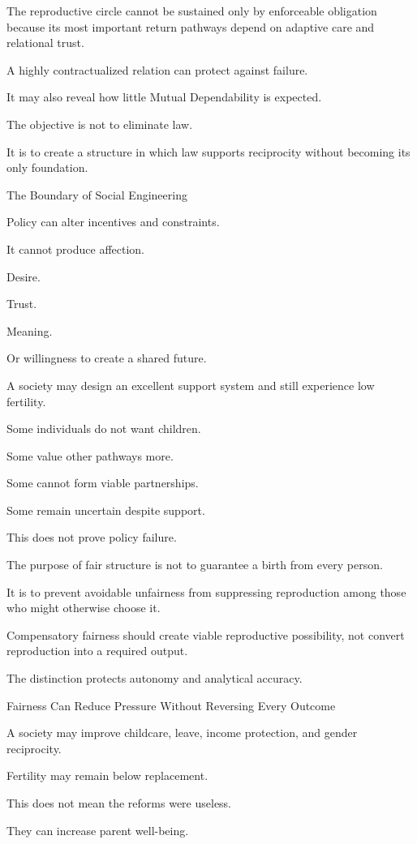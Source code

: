 The reproductive circle cannot be sustained only by enforceable obligation because its most important return pathways depend on adaptive care and relational trust.

A highly contractualized relation can protect against failure.

It may also reveal how little Mutual Dependability is expected.

The objective is not to eliminate law.

It is to create a structure in which law supports reciprocity without becoming its only foundation.

The Boundary of Social Engineering

Policy can alter incentives and constraints.

It cannot produce affection.

Desire.

Trust.

Meaning.

Or willingness to create a shared future.

A society may design an excellent support system and still experience low fertility.

Some individuals do not want children.

Some value other pathways more.

Some cannot form viable partnerships.

Some remain uncertain despite support.

This does not prove policy failure.

The purpose of fair structure is not to guarantee a birth from every person.

It is to prevent avoidable unfairness from suppressing reproduction among those who might otherwise choose it.

Compensatory fairness should create viable reproductive possibility, not convert reproduction into a required output.

The distinction protects autonomy and analytical accuracy.

Fairness Can Reduce Pressure Without Reversing Every Outcome

A society may improve childcare, leave, income protection, and gender reciprocity.

Fertility may remain below replacement.

This does not mean the reforms were useless.

They can increase parent well-being.


